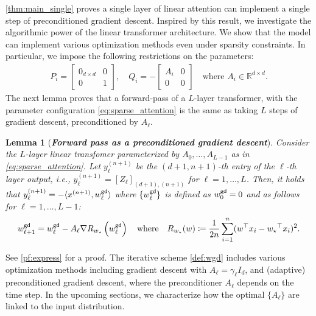 \documentclass{article}
\newcommand{\R}{\mathbb{R}}
\newtheorem{lemma}{Lemma}
\newcommand{\wstar}{w_\star}
\newcommand{\tx}[1]{x^{(#1)}}
\newcommand{\ty}[1]{y^{(#1)}}
\newcommand{\emphh}[1]{\textbf{\emph{#1}}}
\newcommand{\wgd}{w^{\sf gd}}
\newcommand*\lrp[1]{\left( #1 \right)}
\begin{document}
\autoref{thm:main_single} proves a single layer of linear attention can implement a single step of preconditioned gradient descent. Inspired by this result, we investigate the algorithmic power of the linear transformer architecture. We show that the model can implement various optimization methods even under sparsity constraints. In particular, we impose the following restrictions on the parameters:
\begin{align}\label{eq:sparse_attention}
P_i = \begin{bmatrix}
0_{d\times d} & 0 \\ 
0 & 1 
\end{bmatrix}, \quad Q_i = -  \begin{bmatrix}
A_i & 0 \\ 
0 & 0
\end{bmatrix} \quad \text{where $A_i \in \R^{d\times d}$.}
\end{align}
The next lemma proves that a forward-pass of a $L$-layer transformer, with the parameter configuration \eqref{eq:sparse_attention} is the same as taking $L$ steps of gradient descent, preconditioned by $A_\ell$.
 
  



\begin{lemma}[\emphh{Forward pass as a preconditioned gradient descent}] 
\label{lem:express}
Consider the $L$-layer linear transfomer parameterized by $A_0,\dots,A_{L-1}$ as in \eqref{eq:sparse_attention}.  
Let $\ty{n+1}_\ell$ be the $(d+1,n+1)$-th entry of the $\ell$-th layer output, i.e., $\ty{n+1}_\ell = [Z_{\ell}]_{(d+1),(n+1)}$ for $\ell=1,\dots, L$.
Then, it holds that $\ty{n+1}_\ell = - \langle\tx{n+1}, \wgd_\ell \rangle$ where $\{\wgd_\ell\}$ is defined as $\wgd_0=0$ and as follows for $\ell=1,\dots, L-1$:
\begin{align} \label{def:wgd}
\wgd_{\ell+1} = \wgd_{\ell} - A_\ell \nabla R_{\wstar}\lrp{\wgd_{\ell}}\quad \text{where} \quad R_{\wstar}(w) \coloneqq \frac{1}{2n}\sum_{i=1}^{n}(w^\top x_{i}- {\wstar}^\top x_{i})^2.
\end{align} 
\end{lemma}

See \autoref{pf:express} for a proof. The iterative scheme \eqref{def:wgd} includes various optimization methods including  gradient descent with $A_\ell = \gamma_\ell I_d$, and (adaptive) preconditioned gradient descent, where the preconditioner $A_\ell$ depends on the time step. In the upcoming sections, we characterize how the optimal $\{A_\ell\}$ are linked to the input distribution.
\end{document}
